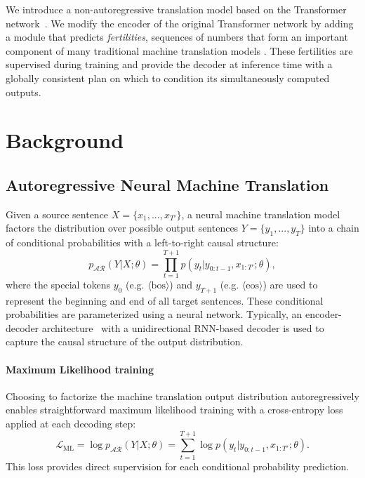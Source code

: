 \documentclass{article} %
\begin{document}
We introduce a non-autoregressive translation model based on the Transformer network~\citep{vaswani2017attention}. We modify the encoder of the original Transformer network by adding a module that predicts \emph{fertilities}, sequences of numbers that form an important component of many traditional machine translation models \citep{brown1993mathematics}.
These fertilities are supervised during training and provide the decoder at inference time with a globally consistent plan on which to condition its simultaneously computed outputs.

\section{Background}
\subsection{Autoregressive Neural Machine Translation}
Given a source sentence $X=\{x_1, ..., x_{T'}\}$, a neural machine translation model factors the distribution over possible output sentences $Y=\{y_1, ..., y_T\}$ into a chain of conditional probabilities with a left-to-right causal structure:
\begin{equation}
p_{\mathcal{AR}}(Y|X; \theta) = \prod_{t=1}^{T+1} p(y_t| y_{0:t-1}, x_{1:T'}; \theta),
\end{equation}
where the special tokens $y_0$ (e.g. $\langle \mathrm{bos}\rangle$) and $y_{T+1}$ (e.g. $\langle \mathrm{eos}\rangle$) are used to represent the beginning and end of all target sentences.
These conditional probabilities are parameterized using a neural network. Typically, an encoder-decoder architecture~\citep{sutskever2014sequence} with a unidirectional RNN-based decoder is used to capture the causal structure of the output distribution.

\vspace{-5pt}
\paragraph{Maximum Likelihood training}
Choosing to factorize the machine translation output distribution autoregressively enables straightforward maximum likelihood training with a cross-entropy loss applied at each decoding step:
\begin{equation}
\mathcal{L}_{\text{ML}} = \log p_{\mathcal{AR}}(Y|X; \theta) = \sum_{t=1}^{T+1}\log p(y_t|y_{0:t-1},x_{1:T'};\theta).
\end{equation}
This loss provides direct supervision for each conditional probability prediction.
\end{document}
